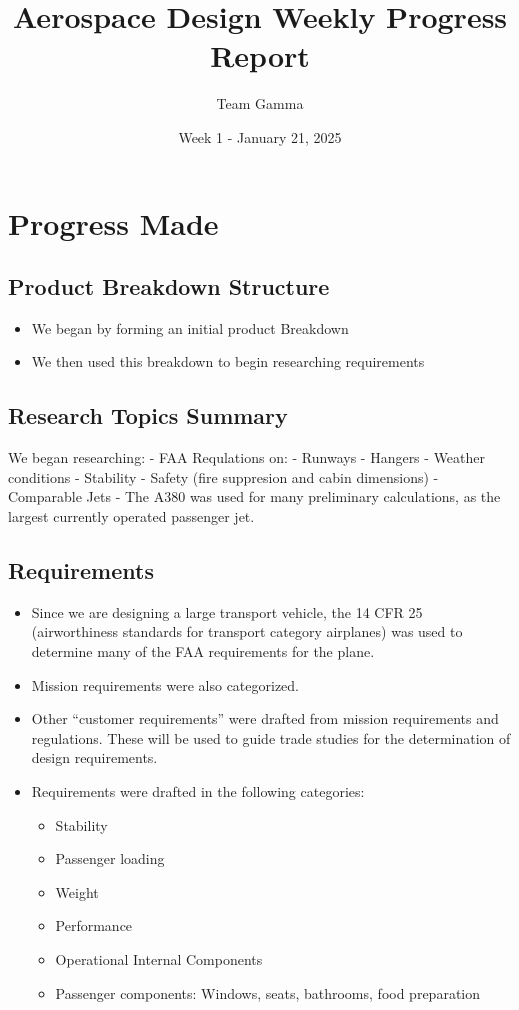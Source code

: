 \documentclass[10pt]{article}
\title{Aerospace Design Weekly Progress Report}
\author{Team Gamma}
\date{Week 1 - January 21, 2025}
\begin{document}
\maketitle

\section{Progress Made}\label{progress-made}

\subsection{Product Breakdown
Structure}\label{product-breakdown-structure}

\begin{itemize}
\tightlist
\item
  We began by forming an initial product Breakdown
\item
  We then used this breakdown to begin researching requirements
\end{itemize}

\subsection{Research Topics Summary}\label{research-topics-summary}

We began researching: - FAA Requlations on: - Runways - Hangers -
Weather conditions - Stability - Safety (fire suppresion and cabin
dimensions) - Comparable Jets - The A380 was used for many preliminary
calculations, as the largest currently operated passenger jet.

\subsection{Requirements}\label{requirements}

\begin{itemize}
\tightlist
\item
  Since we are designing a large transport vehicle, the 14 CFR 25
  (airworthiness standards for transport category airplanes) was used to
  determine many of the FAA requirements for the plane.
\item
  Mission requirements were also categorized.
\item
  Other ``customer requirements'' were drafted from mission requirements
  and regulations. These will be used to guide trade studies for the
  determination of design requirements.
\item
  Requirements were drafted in the following categories:

  \begin{itemize}
  \tightlist
  \item
    Stability
  \item
    Passenger loading
  \item
    Weight
  \item
    Performance
  \item
    Operational Internal Components
  \item
    Passenger components: Windows, seats, bathrooms, food preparation
  \end{itemize}
\end{itemize}
\end{document}
